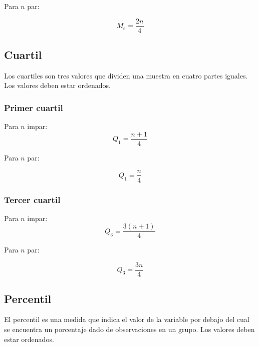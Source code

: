 \documentclass{report}
\begin{document}
          Para $n$ par:

          \begin{equation*}
            M_e=\frac{2n}{4}
          \end{equation*}
       
        \subsection*{Cuartil}
          Los cuartiles son tres valores que dividen una muestra en cuatro partes
          iguales. Los valores deben estar ordenados.
          
          \subsubsection*{Primer cuartil}
          
            \indent Para $n$ impar:
            \begin{equation*}
              Q_1=\frac{n+1}{4}
            \end{equation*}

            Para $n$ par:

            \begin{equation*}
              Q_1=\frac{n}{4}
            \end{equation*}

          \subsubsection*{Tercer cuartil}
            
            \indent Para $n$ impar:
            \begin{equation*}
              Q_3=\frac{3(n+1)}{4}
            \end{equation*}

            Para $n$ par:

            \begin{equation*}
              Q_3=\frac{3n}{4}
            \end{equation*} 

        \subsection*{Percentil}
          El percentil es una medida que indica el valor de la variable por debajo 
          del cual se encuentra un porcentaje dado de observaciones en un grupo.
          Los valores deben estar ordenados.
\end{document}
